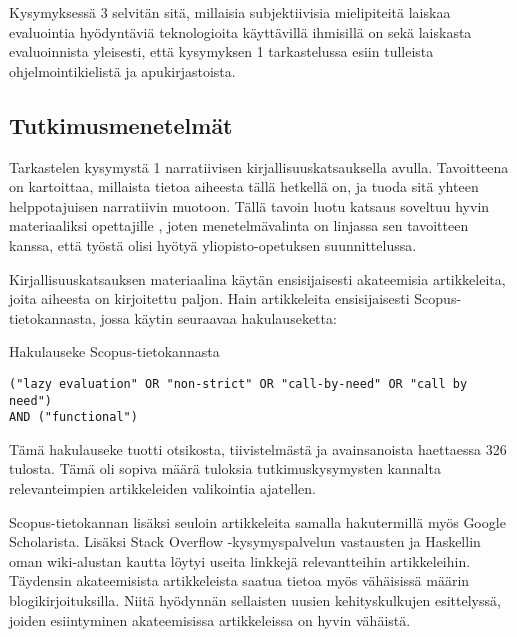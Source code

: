 Kysymyksessä 3 selvitän sitä, millaisia subjektiivisia mielipiteitä laiskaa evaluointia hyödyntäviä teknologioita käyttävillä ihmisillä on sekä laiskasta evaluoinnista yleisesti, että kysymyksen 1 tarkastelussa esiin tulleista ohjelmointikielistä ja apukirjastoista.

\subsection{Tutkimusmenetelmät}

Tarkastelen kysymystä 1 narratiivisen kirjallisuuskatsauksella avulla. Tavoitteena on kartoittaa, millaista tietoa aiheesta tällä hetkellä on, ja tuoda sitä yhteen helppotajuisen narratiivin muotoon. Tällä tavoin luotu katsaus soveltuu hyvin materiaaliksi opettajille \citep[s. 312]{baumeister1997writing}, joten menetelmävalinta on linjassa sen tavoitteen kanssa, että työstä olisi hyötyä yliopisto-opetuksen suunnittelussa.

Kirjallisuuskatsauksen materiaalina käytän ensisijaisesti akateemisia artikkeleita, joita aiheesta on kirjoitettu paljon. Hain artikkeleita ensisijaisesti Scopus-tietokannasta, jossa käytin seuraavaa hakulauseketta:

\begin{listing}[H]
  \caption{Hakulauseke Scopus-tietokannasta}
  \bigskip
  \begin{verbatim}
("lazy evaluation" OR "non-strict" OR "call-by-need" OR "call by need")
AND ("functional")
  \end{verbatim}
\end{listing}


Tämä hakulauseke tuotti otsikosta, tiivistelmästä ja avainsanoista haettaessa 326 tulosta. Tämä oli sopiva määrä tuloksia tutkimuskysymysten kannalta relevanteimpien artikkeleiden valikointia ajatellen.

Scopus-tietokannan lisäksi seuloin artikkeleita samalla hakutermillä myös Google Scholarista. Lisäksi Stack Overflow -kysymyspalvelun vastausten ja Haskellin oman wiki-alustan kautta löytyi useita linkkejä relevantteihin artikkeleihin. Täydensin akateemisista artikkeleista saatua tietoa myös vähäisissä määrin blogikirjoituksilla. Niitä hyödynnän sellaisten uusien kehityskulkujen esittelyssä, joiden esiintyminen akateemisissa artikkeleissa on hyvin vähäistä.

